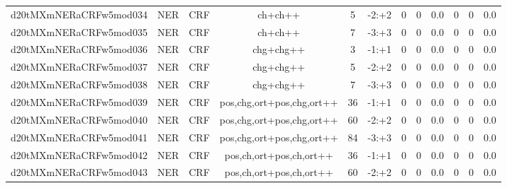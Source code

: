 \documentclass[a4paper]{article}
\begin{document}
\begin{landscape}
\begin{center}
\begin{tabular}{ |c|c|c|c|c|c|c|c|c|c|c|c|}
 
 	
 	\small{ d20tMXmNERaCRFw5mod034 } & \small{ NER} & \small{  CRF }  & ch+ch++  &  5 &  \small{  -2:+2 }  &  0 & 0 & 0.0  &  0 & 0 & 0.0 \\
 	

 
 	
 	\small{ d20tMXmNERaCRFw5mod035 } & \small{ NER} & \small{  CRF }  & ch+ch++  &  7 &  \small{  -3:+3 }  &  0 & 0 & 0.0  &  0 & 0 & 0.0 \\
 	

 
 	
 	\small{ d20tMXmNERaCRFw5mod036 } & \small{ NER} & \small{  CRF }  & chg+chg++  &  3 &  \small{  -1:+1 }  &  0 & 0 & 0.0  &  0 & 0 & 0.0 \\
 	

 
 	
 	\small{ d20tMXmNERaCRFw5mod037 } & \small{ NER} & \small{  CRF }  & chg+chg++  &  5 &  \small{  -2:+2 }  &  0 & 0 & 0.0  &  0 & 0 & 0.0 \\
 	

 
 	
 	\small{ d20tMXmNERaCRFw5mod038 } & \small{ NER} & \small{  CRF }  & chg+chg++  &  7 &  \small{  -3:+3 }  &  0 & 0 & 0.0  &  0 & 0 & 0.0 \\
 	

 
 	
 	\small{ d20tMXmNERaCRFw5mod039 } & \small{ NER} & \small{  CRF }  & pos,chg,ort+pos,chg,ort++  &  36 &  \small{  -1:+1 }  &  0 & 0 & 0.0  &  0 & 0 & 0.0 \\
 	

 
 	
 	\small{ d20tMXmNERaCRFw5mod040 } & \small{ NER} & \small{  CRF }  & pos,chg,ort+pos,chg,ort++  &  60 &  \small{  -2:+2 }  &  0 & 0 & 0.0  &  0 & 0 & 0.0 \\
 	

 
 	
 	\small{ d20tMXmNERaCRFw5mod041 } & \small{ NER} & \small{  CRF }  & pos,chg,ort+pos,chg,ort++  &  84 &  \small{  -3:+3 }  &  0 & 0 & 0.0  &  0 & 0 & 0.0 \\
 	

 
 	
 	\small{ d20tMXmNERaCRFw5mod042 } & \small{ NER} & \small{  CRF }  & pos,ch,ort+pos,ch,ort++  &  36 &  \small{  -1:+1 }  &  0 & 0 & 0.0  &  0 & 0 & 0.0 \\
 	

 
 	
 	\small{ d20tMXmNERaCRFw5mod043 } & \small{ NER} & \small{  CRF }  & pos,ch,ort+pos,ch,ort++  &  60 &  \small{  -2:+2 }  &  0 & 0 & 0.0  &  0 & 0 & 0.0 \\
 	


\end{tabular}
\end{center}
\end{landscape}
\end{document}
